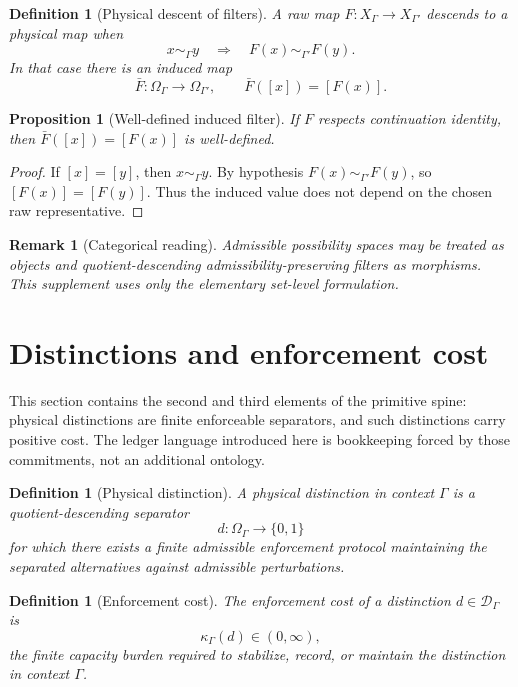 \documentclass[11pt]{article}
\newtheorem{proposition}[theorem]{Proposition}
\newtheorem{definition}[theorem]{Definition}
\newtheorem{remark}[theorem]{Remark}
\begin{document}
\begin{definition}[Physical descent of filters]
A raw map $F:X_\Gamma\to X_{\Gamma'}$ descends to a physical map when
\[
 x\sim_\Gamma y\quad\Longrightarrow\quad F(x)\sim_{\Gamma'}F(y).
\]
In that case there is an induced map
\[
 \bar F:\Omega_\Gamma\to\Omega_{\Gamma'},
 \qquad \bar F([x])=[F(x)].
\]
\end{definition}

\begin{proposition}[Well-defined induced filter]
If $F$ respects continuation identity, then $\bar F([x])=[F(x)]$ is well-defined.
\end{proposition}
\begin{proof}
If $[x]=[y]$, then $x\sim_\Gamma y$.  By hypothesis $F(x)\sim_{\Gamma'}F(y)$, so $[F(x)]=[F(y)]$.  Thus the induced value does not depend on the chosen raw representative.
\end{proof}

\begin{remark}[Categorical reading]
Admissible possibility spaces may be treated as objects and quotient-descending admissibility-preserving filters as morphisms.  This supplement uses only the elementary set-level formulation.
\end{remark}

\section{Distinctions and enforcement cost}\label{sec:distinctions-cost}

This section contains the second and third elements of the primitive spine: physical distinctions are finite enforceable separators, and such distinctions carry positive cost.  The ledger language introduced here is bookkeeping forced by those commitments, not an additional ontology.

\begin{definition}[Physical distinction]
A \emph{physical distinction} in context $\Gamma$ is a quotient-descending separator
\[
 d:\Omega_\Gamma\to\{0,1\}
\]
for which there exists a finite admissible enforcement protocol maintaining the separated alternatives against admissible perturbations.
\end{definition}

\begin{definition}[Enforcement cost]
The enforcement cost of a distinction $d\in\mathcal D_\Gamma$ is
\[
 \kappa_\Gamma(d)\in(0,\infty),
\]
the finite capacity burden required to stabilize, record, or maintain the distinction in context $\Gamma$.
\end{definition}
\end{document}
